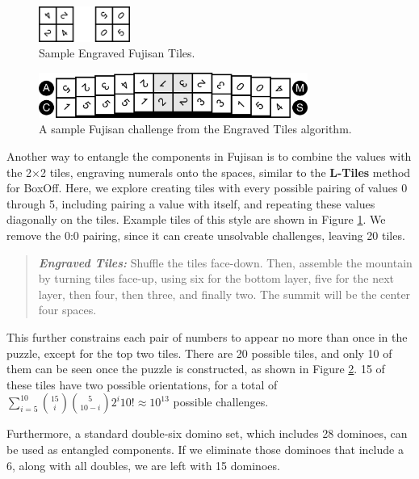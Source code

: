 \documentclass[journal]{IEEEtran}
\begin{document}
\begin{figure}[t]
\centering
\includegraphics[width=3cm]{figure13.png}
\caption{Sample Engraved Fujisan Tiles.}
\label{fig:engravedsample}
\end{figure}


\begin{figure}[b]
\includegraphics[width=8.8cm]{figure14.png}
\caption{A sample Fujisan challenge from the Engraved Tiles algorithm.}
\label{fig:tileexample}
\end{figure}



Another way to entangle the components in Fujisan is to combine the values with the 2$\times$2 tiles, engraving numerals onto the spaces, similar to the \textbf{L-Tiles} method for BoxOff. Here, we explore creating tiles with every possible pairing of values 0 through 5, including pairing a value with itself, and repeating these values diagonally on the tiles. Example tiles of this style are shown in Figure \ref{fig:engravedsample}. We remove the 0:0 pairing, since it can create unsolvable challenges, leaving 20 tiles.

\begin{quote}
    
  {\it \bf Engraved Tiles:} Shuffle the tiles face-down. Then, assemble the mountain by turning tiles face-up, using six for the bottom layer, five for the next layer, then four, then three, and finally two. The summit will be the center four spaces.
\end{quote}

This further constrains each pair of numbers to appear no more than once in the puzzle, except for the top two tiles. There are 20 possible tiles, and only 10 of them can be seen once the puzzle is constructed, as shown in Figure \ref{fig:tileexample}. 15 of these tiles have two possible orientations, for a total of $\sum_{i = 5}^{10}{15 \choose i}\binom{5}{10 - i}2^{i}10! \approx 10^{13}
$ possible challenges.

Furthermore, a standard double-six domino set, which includes 28 dominoes, 
can be used as entangled components. If we eliminate those dominoes that include a 6, along with all doubles, we are left with 15 dominoes. 
\end{document}
